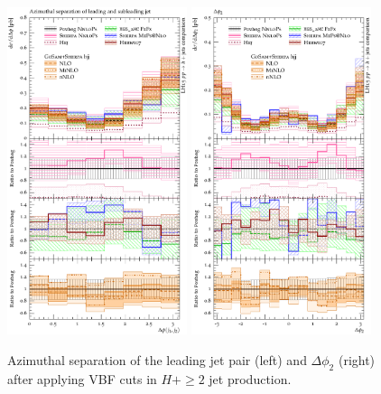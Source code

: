 \begin{figure}[t!]
  \centering
  \includegraphics[width=0.47\textwidth]{figures/hjetscomp_deltaphi_jj_VBF.pdf}
  \hfill
  \includegraphics[width=0.47\textwidth]{figures/hjetscomp_deltaphi2_VBF.pdf}
  \caption{
    Azimuthal separation of the leading jet pair (left) and 
    $\Delta\phi_2$ (right) after applying VBF cuts in $H+\ge2$ jet
    production.
    \label{fig:higgscomp:results:VBFobs:dphijj_phi2}
  }
\end{figure}

